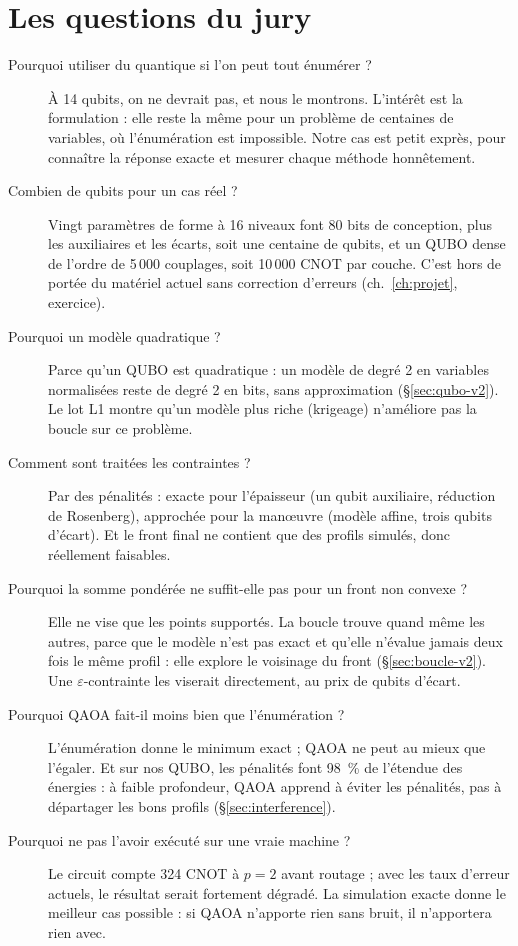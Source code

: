 \section{Les questions du jury}
\begin{description}
\item[Pourquoi utiliser du quantique si l'on peut tout énumérer ?] À 14 qubits, on ne devrait pas, et nous le montrons. L'intérêt est la formulation : elle reste la même pour un problème de centaines de variables, où l'énumération est impossible. Notre cas est petit exprès, pour connaître la réponse exacte et mesurer chaque méthode honnêtement.
\item[Combien de qubits pour un cas réel ?] Vingt paramètres de forme à 16 niveaux font 80 bits de conception, plus les auxiliaires et les écarts, soit une centaine de qubits, et un QUBO dense de l'ordre de 5\,000 couplages, soit 10\,000 CNOT par couche. C'est hors de portée du matériel actuel sans correction d'erreurs (ch.~\ref{ch:projet}, exercice).
\item[Pourquoi un modèle quadratique ?] Parce qu'un QUBO est quadratique : un modèle de degré 2 en variables normalisées reste de degré 2 en bits, sans approximation (§\ref{sec:qubo-v2}). Le lot L1 montre qu'un modèle plus riche (krigeage) n'améliore pas la boucle sur ce problème.
\item[Comment sont traitées les contraintes ?] Par des pénalités : exacte pour l'épaisseur (un qubit auxiliaire, réduction de Rosenberg), approchée pour la manœuvre (modèle affine, trois qubits d'écart). Et le front final ne contient que des profils simulés, donc réellement faisables.
\item[Pourquoi la somme pondérée ne suffit-elle pas pour un front non convexe ?] Elle ne vise que les points supportés. La boucle trouve quand même les autres, parce que le modèle n'est pas exact et qu'elle n'évalue jamais deux fois le même profil : elle explore le voisinage du front (§\ref{sec:boucle-v2}). Une $\varepsilon$-contrainte les viserait directement, au prix de qubits d'écart.
\item[Pourquoi QAOA fait-il moins bien que l'énumération ?] L'énumération donne le minimum exact ; QAOA ne peut au mieux que l'égaler. Et sur nos QUBO, les pénalités font 98~\% de l'étendue des énergies : à faible profondeur, QAOA apprend à éviter les pénalités, pas à départager les bons profils (§\ref{sec:interference}).
\item[Pourquoi ne pas l'avoir exécuté sur une vraie machine ?] Le circuit compte 324 CNOT à $p=2$ avant routage ; avec les taux d'erreur actuels, le résultat serait fortement dégradé. La simulation exacte donne le meilleur cas possible : si QAOA n'apporte rien sans bruit, il n'apportera rien avec.

\end{description}

